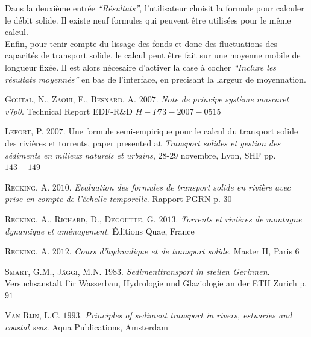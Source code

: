 \documentclass[a4paper,10pt]{article}
\begin{document}
\noindent
Dans la deuxi\`eme entr\'ee \emph{``R\'esultats''}, l'utilisateur choisit la formule pour calculer le d\'ebit solide. Il existe neuf formules qui peuvent \^etre utilis\'ees pour le m\^eme calcul. \\

\noindent
Enfin, pour tenir compte du lissage des fonds et donc des fluctuations des capacit\'es de transport solide, le calcul peut \^etre fait sur une moyenne mobile de longueur fix\'ee. Il est alors n\'ecesaire d'activer la case \`a cocher \emph{``Inclure les r\'esultats moyenn\'es'' } en bas de l'interface, en precisant la largeur de moyennation. \\


\newpage
{}
\begin{thebibliography}{1}

 \textsc{Goutal}, N., \textsc{Zaoui}, F., \textsc{Besnard}, A. $2007$. \emph{Note de principe syst\`eme mascaret v7p0}. Technical Report EDF-R\&D $H-P73-2007-0515$

 \textsc{Lefort}, P. $2007$. Une formule semi-empirique pour le calcul du transport solide des rivi\`eres et torrents, paper presented at \emph{Transport solides et gestion des s\'ediments en milieux naturels et urbains}, 28-29 novembre, Lyon, SHF pp. $143-149$

 \textsc{Recking}, A. $2010$. \emph{Evaluation des formules de transport solide en rivi\`ere avec prise en compte de l'\'echelle temporelle}. Rapport PGRN p. $30$

 \textsc{Recking}, A., \textsc{Richard}, D., \textsc{Degoutte}, G. $2013$. \emph{Torrents et rivi\`eres de montagne dynamique et am\'enagement}. \'Editions Quae, France

 \textsc{Recking}, A. $2012$. \emph{Cours d'hydraulique et de transport solide}. Master II, Paris 6

 \textsc{Smart}, G.M., \textsc{J\"aggi}, M.N. $1983$. \emph{Sedimenttransport in steilen Gerinnen}. Versuchsanstalt f\"ur Wasserbau, Hydrologie und Glaziologie an der ETH Zurich p. $91$

 \textsc{Van Rijn}, L.C. $1993$. \emph{Principles of sediment transport in rivers, estuaries and coastal seas}. Aqua Publications, Amsterdam

\end{thebibliography}

\end{document}
